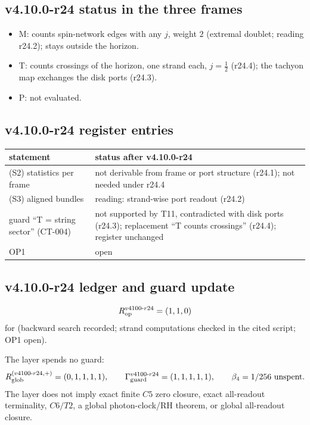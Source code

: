 \subsection*{v4.10.0-r24 status in the three frames}
\label{subsec:v4100-r24-frames}

\begin{itemize}[leftmargin=2em]
\item M: counts spin-network edges with any \(j\), weight \(2\) (extremal doublet; reading r24.2); stays outside the horizon.
\item T: counts crossings of the horizon, one strand each, \(j=\tfrac12\) (r24.4); the tachyon map exchanges the disk ports (r24.3).
\item P: not evaluated.
\end{itemize}

\subsection*{v4.10.0-r24 register entries}
\label{subsec:v4100-r24-register}

\begin{center}
\small
\begin{tabular}{@{}>{\raggedright\arraybackslash}p{}>{\raggedright\arraybackslash}p{}@{}}
\toprule
statement & status after v4.10.0-r24\\
\midrule
(S2) statistics per frame & not derivable from frame or port structure (r24.1); not needed under r24.4\\
(S3) aligned bundles & reading: strand-wise port readout (r24.2)\\
guard ``T = string sector'' (CT-004) & not supported by T11, contradicted with disk ports (r24.3); replacement ``T counts crossings'' (r24.4); register unchanged\\
OP1 & open\\
\bottomrule
\end{tabular}
\end{center}

\subsection*{v4.10.0-r24 ledger and guard update}
\label{subsec:v4100-r24-ledger-guard}

\[
R_{\rm op}^{v4100\text{-}r24}=(1,1,0)
\]
for (backward search recorded; strand computations checked in the cited script; OP1 open).

The layer spends no guard:
\[
R_{\rm glob}^{(v4100\text{-}r24,+)}=(0,1,1,1,1),
\qquad
\Gamma_{\rm guard}^{v4100\text{-}r24}=(1,1,1,1,1),
\qquad
\beta_4=1/256\ \text{unspent}.
\]
The layer does not imply exact finite \(C5\) zero closure, exact all-readout terminality, \(C6/T2\), a global photon-clock/RH theorem,
or global all-readout closure.
